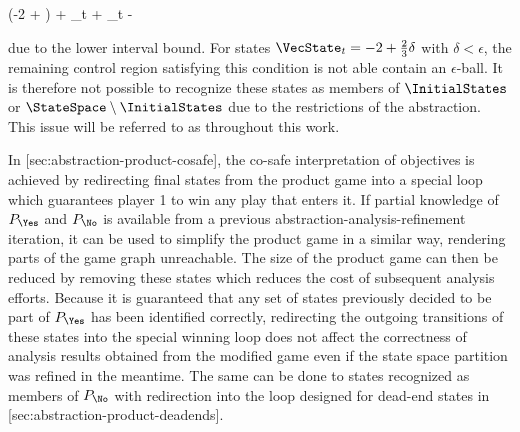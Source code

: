     \startformula
        \startalign[n=3,align={middle,right,left}]
            \NC \empty
             \Big({-2} +  \delta\Big) + \VecControl_t + 
            \NC \subseteq {}
            \NR
            \NC \Leftrightarrow \quad
            \NC {}
            \NC \subseteq {}
            \NR
            \NC \Rightarrow \quad
            \NC \VecControl_t
            \NC {} - \delta
            \NR
        \stopalign
    \stopformula

    due to the lower interval bound.
    For states $\VecState_t = -2 + \frac{2}{3} \delta$ with $\delta < \epsilon$, the remaining control region satisfying this condition is not able contain an $\epsilon$-ball.
    It is therefore not possible to recognize these states as members of $\InitialStates$ or $\StateSpace \setminus \InitialStates$ due to the restrictions of the abstraction.
    This issue will be referred to as  throughout this work.

\stopsubsection


\startsubsection[title={Product Game Simplification},reference=sec:abstraction-analysis-simplification]

    In [sec:abstraction-product-cosafe], the co-safe interpretation of objectives is achieved by redirecting final states from the product game into a special loop which guarantees player 1 to win any play that enters it.
    If partial knowledge of $P_\Yes$ and $P_\No$ is available from a previous abstraction-analysis-refinement iteration, it can be used to simplify the product game in a similar way, rendering parts of the game graph unreachable.
    The size of the product game can then be reduced by removing these states which reduces the cost of subsequent analysis efforts.
    Because it is guaranteed that any set of states previously decided to be part of $P_\Yes$ has been identified correctly, redirecting the outgoing transitions of these states into the special winning loop does not affect the correctness of analysis results obtained from the modified game even if the state space partition was refined in the meantime.
    The same can be done to states recognized as members of $P_\No$ with redirection into the loop designed for dead-end states in [sec:abstraction-product-deadends].

